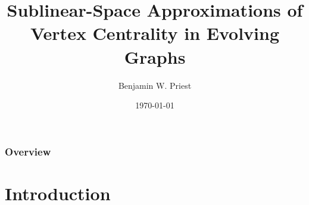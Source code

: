 \documentclass{beamer}
\title[Sublinear Centrality]{Sublinear-Space Approximations of Vertex Centrality in Evolving Graphs} %
\author[Priest]{Benjamin W. Priest} %
\institute[Dartmouth] %
{
Thayer School of Engineering \\
 Dartmouth College \\ %
\medskip
\textit{benjamin.w.priest.th@dartmouth}\\ %
}
\date{\today} %
\begin{document}
\begin{frame}
\titlepage %
\end{frame}

\begin{frame}
\frametitle{Overview} %
\tableofcontents %
\end{frame}



\section{Introduction}
\end{document}

